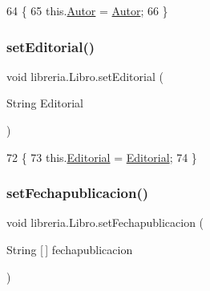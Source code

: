 \begin{DoxyCode}
64                                        \{
65         this.\mbox{\hyperlink{classlibreria_1_1_libro_aa5040773b6ae3f4b9538418a4499ba9c}{Autor}} = \mbox{\hyperlink{classlibreria_1_1_libro_aa5040773b6ae3f4b9538418a4499ba9c}{Autor}};
66     \}
\end{DoxyCode}
\mbox{\label{classlibreria_1_1_libro_a4fbeb961016d6cd0bd63ff2b252010ee}} 
\subsubsection{\texorpdfstring{set\+Editorial()}{setEditorial()}}
{\footnotesize\ttfamily void libreria.\+Libro.\+set\+Editorial (\begin{DoxyParamCaption}\item[{String}]{Editorial }\end{DoxyParamCaption})\hspace{0.3cm}{\ttfamily [inline]}}


\begin{DoxyCode}
72                                                \{
73         this.\mbox{\hyperlink{classlibreria_1_1_libro_a0e45b510f79de7f6aaa678f4cf060b45}{Editorial}} = \mbox{\hyperlink{classlibreria_1_1_libro_a0e45b510f79de7f6aaa678f4cf060b45}{Editorial}};
74     \}
\end{DoxyCode}
\mbox{\label{classlibreria_1_1_libro_af7ef1b61c19ad0c9b9c37e84e16dd943}} 
\subsubsection{\texorpdfstring{set\+Fechapublicacion()}{setFechapublicacion()}}
{\footnotesize\ttfamily void libreria.\+Libro.\+set\+Fechapublicacion (\begin{DoxyParamCaption}\item[{String \mbox{[}$\,$\mbox{]}}]{fechapublicacion }\end{DoxyParamCaption})\hspace{0.3cm}{\ttfamily [inline]}}


